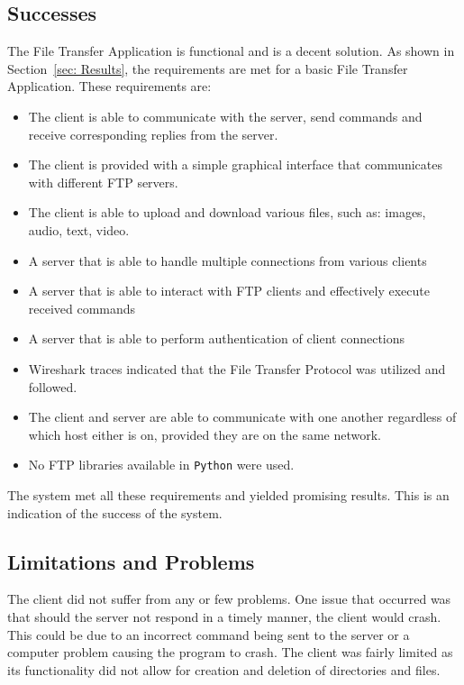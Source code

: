 \documentclass[10pt, conference]{IEEEtran}
\def\code#1{\texttt{#1}}
\begin{document}
\subsection{Successes}
\label{sec: Successes}
The File Transfer Application is functional and is a decent solution. As shown in Section~\ref{sec: Results}, the requirements are met for a basic File Transfer Application. These requirements are:
\begin{itemize}
\item The client is able to communicate with the server, send commands and receive corresponding replies from the server.
\item The client is provided with a simple graphical interface that communicates with different FTP servers.
\item The client is able to upload and download various files, such as: images, audio, text, video.
\item A server that is able to handle multiple connections from various clients
\item A server that is able to interact with FTP clients and effectively execute received commands
\item A server that is able to perform authentication of client connections
\item Wireshark traces indicated that the File Transfer Protocol was utilized and followed.
\item The client and server are able to communicate with one another regardless of which host either is on, provided they are on the same network.
\item No FTP libraries available in \code{Python} were used.

\end{itemize}

The system met all these requirements and yielded promising results. This is an indication of the success of the system.


\subsection{Limitations and Problems}
\label{sec: Limitations and Problems}
The client did not suffer from any or few problems. One issue that occurred was that should the server not respond in a timely manner, the client would crash. This could be due to an incorrect command being sent to the server or a computer problem causing the program to crash. The client was fairly limited as its functionality did not allow for creation and deletion of directories and files. 
\end{document}
